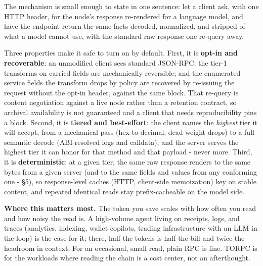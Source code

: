 \documentclass[11pt]{article}
\begin{document}
The mechanism is small enough to state in one sentence: let a client ask, with one HTTP header, for the node's response re-rendered for a language model, and have the endpoint return the same facts decoded, normalized, and stripped of what a model cannot use, with the standard raw response one re-query away.

Three properties make it safe to turn on by default. First, it is \textbf{opt-in and recoverable}: an unmodified client sees standard JSON-RPC; the tier-1 transforms on carried fields are mechanically reversible; and the enumerated service fields the transform drops by policy are recovered by re-issuing the request without the opt-in header, against the same block. That re-query is content negotiation against a live node rather than a retention contract, so archival availability is not guaranteed and a client that needs reproducibility pins a block. Second, it is \textbf{tiered and best-effort}: the client names the \emph{highest} tier it will accept, from a mechanical pass (hex to decimal, dead-weight drops) to a full semantic decode (ABI-resolved logs and calldata), and the server serves the highest tier it can honor for that method and that payload - never more. Third, it is \textbf{deterministic}: at a given tier, the same raw response renders to the same bytes from a given server (and to the same fields and values from any conforming one - \S5), so response-level caches (HTTP, client-side memoization) key on stable content, and repeated identical reads stay prefix-cacheable on the model side.

\textbf{Where this matters most.} The token you save scales with how often you read and how noisy the read is. A high-volume agent living on receipts, logs, and traces (analytics, indexing, wallet copilots, trading infrastructure with an LLM in the loop) is the case for it; there, half the tokens is half the bill and twice the headroom in context. For an occasional, small read, plain RPC is fine. TORPC is for the workloads where reading the chain is a cost center, not an afterthought.
\end{document}
